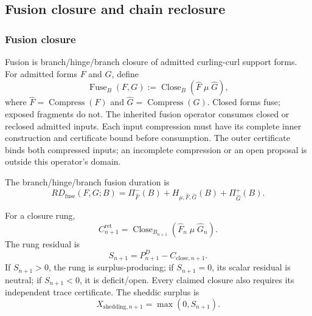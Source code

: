\subsection{Fusion closure and chain reclosure}
\label{sec:fusion-closure-chain-reclosure}

\subsubsection{Fusion closure}
\label{subsec:fusion-closure}
Fusion is branch/hinge/branch closure of admitted curling-curl support forms. For admitted forms \(F\) and \(G\), define
\begin{equation}
\operatorname{Fuse}_{B}(F,G)
:=
\operatorname{Close}_{B}
\left(
\widehat F\;\mu\;\widehat G
\right),
\label{eq:fusion-closure}
\end{equation}
where \(\widehat F=\operatorname{Compress}(F)\) and \(\widehat G=\operatorname{Compress}(G)\). Closed forms fuse; exposed fragments do not.
The inherited fusion operator consumes closed or reclosed admitted inputs.
Each input compression must have its complete inner construction and certificate
bound before consumption. The outer certificate binds both compressed inputs;
an incomplete compression or an open proposal is outside this operator's domain.

The branch/hinge/branch fusion duration is
\begin{equation}
RD_{\mathrm{fuse}}(F,G;B)
=
\Pi^-_{\widehat F}(B)+H_{\mu,\widehat F,\widehat G}(B)+\Pi^+_{\widehat G}(B).
\label{eq:fusion-branch-hinge-duration}
\end{equation}

For a closure rung,
\begin{equation}
C^{\mathrm{ret}}_{n+1}
=
\operatorname{Close}_{B_{n+1}}
\left(
\widehat F_n\;\mu\;\widehat G_n
\right).
\label{eq:fusion-ladder-rung}
\end{equation}
The rung residual is
\begin{equation}
S_{n+1}=P^D_{n+1}-C_{\mathrm{close},n+1}.
\label{eq:fusion-rung-residual}
\end{equation}
If \(S_{n+1}>0\), the rung is surplus-producing; if \(S_{n+1}=0\), its scalar residual is neutral; if \(S_{n+1}<0\), it is deficit/open. Every claimed closure also requires its independent trace certificate. The sheddic surplus is
\begin{equation}
X_{\mathrm{shedding},n+1}=\max(0,S_{n+1}).
\label{eq:fusion-rung-shedding-surplus}
\end{equation}

